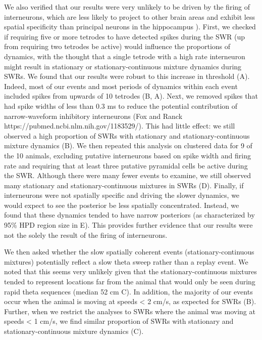 \documentclass[9pt,lineno]{elife}
\begin{document}
We also verified that our results were very unlikely to be driven by the firing of interneurons, which are less likely to project to other brain areas and exhibit less spatial specificity than principal neurons in the hippocampus \citep{HangyaComplementaryspatialfiring2010, WilentDiscretePlaceFields2007}). First, we checked if requiring five or more tetrodes to have detected spikes during the SWR (up from requiring two tetrodes be active) would influence the proportions of dynamics, with the thought that a single tetrode with a high rate interneuron might result in stationary or stationary-continuous mixture dynamics during SWRs. We found that our results were robust to this increase in threshold (A). Indeed, most of our events and most periods of dynamics within each event included spikes from upwards of 10 tetrodes (B, A). Next, we removed spikes that had spike widths of less than 0.3 ms to reduce the potential contribution of narrow-waveform inhibitory interneurons (Fox and Ranck https://pubmed.ncbi.nlm.nih.gov/1183529/). This had little effect: we still observed a high proportion of SWRs with stationary and stationary-continuous mixture dynamics (B). We then repeated this analysis on clustered data for 9 of the 10 animals, excluding putative interneurons based on spike width and firing rate and requiring that at least three putative pyramidal cells be active during the SWR. Although there were many fewer events to examine, we still observed many stationary and stationary-continuous mixtures in SWRs (D). Finally, if interneurons were not spatially specific and driving the slower dynamics, we would expect to see the posterior be less spatially concentrated. Instead, we found that these dynamics tended to have narrow posteriors (as characterized by 95\% HPD region size in E). This provides further evidence that our results were not the solely the result of the firing of interneurons. 

We then asked whether the slow spatially coherent events (stationary-continuous mixtures) potentially reflect a slow theta sweep rather than a replay event. We noted that this seems very unlikely given that the stationary-continuous mixtures tended to represent locations far from the animal that would only be seen during rapid theta sequences (median 52 cm C). In addition, the majority of our events occur when the animal is moving at speeds < 2 cm/s, as expected for SWRs (B). Further, when we restrict the analyses to SWRs where the animal was moving at speeds < 1 cm/s, we find similar proportion of SWRs with stationary and stationary-continuous mixture dynamics (C).
\end{document}
